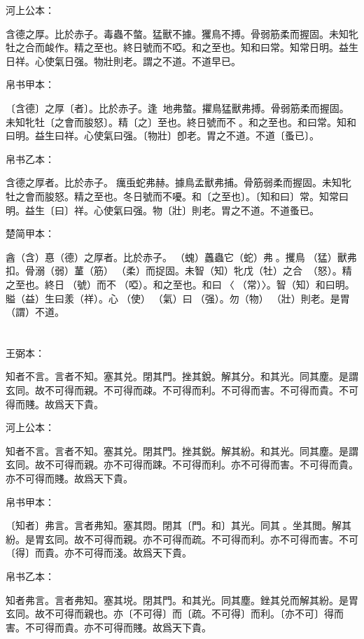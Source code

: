 \documentclass[a5paper]{ctexbook}
\begin{document}
    河上公本：

    含德之厚。比於赤子。毒蟲不螫。猛獸不據。玃鳥不搏。骨弱筋柔而握固。未知牝牡之合而䘒作。精之至也。終日號而不啞。和之至也。知和曰常。知常日明。益生日祥。心使氣日强。物壯則老。謂之不道。不道早已。

    帛书甲本：

    〔含德〕之厚〔者〕。比於赤子。逢𢔯𧍥地弗螫。㩴鳥猛獸弗搏。骨弱筋柔而握固。未知牝牡〔之會而朘怒〕。精〔之〕至也。終日號而不𢖻。和之至也。和曰常。知和曰明。益生曰祥。心使氣曰强。〔物壯〕卽老。胃之不道。不道〔蚤已〕。

    帛书乙本：

    含德之厚者。比於赤子。𧒒癘䖝蛇弗赫。據鳥孟獸弗捕。骨筋弱柔而握固。未知牝牡之會而朘怒。精之至也。冬日號而不嚘。和〔之至也〕。〔知和曰〕常。知常曰明。益生〔曰〕祥。心使氣曰强。物〔壯〕則老。胃之不道。不道蚤已。

    楚简甲本：

    酓（含）惪（德）之厚者。比於赤子。󶵎（螝）䘍蟲它（蛇）弗𧍷。攫鳥󶵏（猛）獸弗扣。骨溺（弱）蓳（筋）󶵐（柔）而捉固。未智（知）牝戊（牡）之合󶵑󶵒（怒）。精之至也。終日󶴋（號）而不𪬐（啞）。和之至也。和曰󶵓〈󼲗（常）〉。智（知）和曰明。賹（益）生曰羕（祥）。心󶴎（使）󶴓（氣）曰󶴔（强）。勿（物）𡒉（壯）則老。是胃（謂）不道。

    \chapter{}
    王弼本：

    知者不言。言者不知。塞其兑。閉其門。挫其銳。解其分。和其光。同其塵。是謂玄同。故不可得而親。不可得而疎。不可得而利。不可得而害。不可得而貴。不可得而賤。故爲天下貴。

    河上公本：

    知者不言。言者不知。塞其兑。閉其門。挫其鋭。解其紛。和其光。同其塵。是謂玄同。故不可得而親。亦不可得而踈。不可得而利。亦不可得而害。不可得而貴。亦不可得而賤。故爲天下貴。

    帛书甲本：

    〔知者〕弗言。言者弗知。塞其悶。閉其〔門。和〕其光。同其𡑁。坐其閲。解其紛。是胃玄同。故不可得而親。亦不可得而疏。不可得而利。亦不可得而害。不可〔得〕而貴。亦不可得而淺。故爲天下貴。

    帛书乙本：

    知者弗言。言者弗知。塞其㙂。閉其門。和其光。同其塵。銼其兑而解其紛。是胃玄同。故不可得而親也。亦〔不可得〕而〔疏。不可得〕而利。〔亦不可〕得而害。不可得而貴。亦不可得而賤。故爲天下貴。
\end{document}
